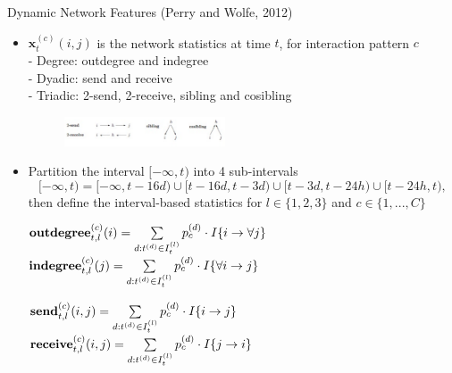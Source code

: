 \documentclass[10pt]{beamer}
\def\bni{\begin{itemize}} \def\ei{\end{itemize}}
\theoremstyle{definition}
\theoremstyle{remark}
\begin{document}
\begin{frame}{Dynamic Network Features (Perry and Wolfe, 2012)}
	\bni
	 \item $\boldsymbol{x}^{(c)}_t(i, j)$ is the network statistics at time $t$, for interaction pattern $c$ \\
	- Degree: outdegree and  indegree\\
 - Dyadic: send and receive \\
 - Triadic: 2-send, 2-receive, sibling and cosibling
	 \begin{figure}
	 	\includegraphics[width=0.45\textwidth]{Triadic.pdf}
	 \end{figure}	
\item Partition the interval $[-\infty, t)$ into 4 sub-intervals
 \footnotesize
 \begin{equation*}
 [-\infty,t) = [-\infty,t-16d)\cup [t-16d, t-3d) \cup [t-3d, t-24h)\cup [t-24h, t),
 \end{equation*}
	 \normalsize
	 then define the interval-based statistics for $l \in \{1,2,3\}$ and $c \in \{1,...,C\}$\\ \vspace{0.4cm}
	 \begin{minipage}{0.49\textwidth}
	 \footnotesize
	  $\mbox{\textbf{outdegree}}^{(c)}_{t, l}(i)=\sum\limits_{d: t^{(d)} \in I_{t}^{(l)}}p_c^{(d)}\cdot I\{i\rightarrow \forall j\}$\\$\mbox{\textbf{indegree}}^{(c)}_{t, l}(j)=\sum\limits_{d: t^{(d)} \in I_{t}^{(l)}}p_c^{(d)}\cdot I\{\forall i \rightarrow j\}$	 
	  \normalsize
	 \end{minipage}
	 	 	 \begin{minipage}{0.44\textwidth}
	 \footnotesize 
	 $\mbox{\textbf{send}}^{(c)}_{t, l}(i, j)=\sum\limits_{d: t^{(d)} \in I_{t}^{(l)}}p_c^{(d)}\cdot I\{i\rightarrow j\}$\\
	  $\mbox{\textbf{receive}}^{(c)}_{t, l}(i, j)=\sum\limits_{d: t^{(d)} \in I_{t}^{(l)}}p_c^{(d)}\cdot I\{j\rightarrow i\}$
	  \normalsize
	 	 		 \end{minipage}
	 \ei
\end{frame}
\end{document}
